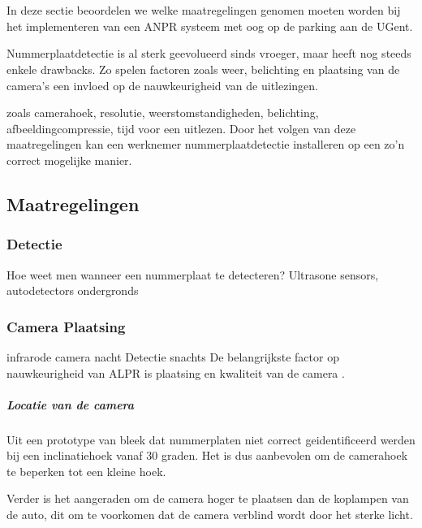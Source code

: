 
\chapter{}
\label{ch:maatregelingenraspberrypi}

In deze sectie beoordelen we welke maatregelingen genomen moeten worden bij het implementeren van een ANPR systeem met oog op de parking aan de UGent.

Nummerplaatdetectie is al sterk geevolueerd sinds vroeger, maar heeft nog steeds enkele drawbacks. Zo spelen factoren zoals weer, belichting en plaatsing van de camera's een invloed op de nauwkeurigheid van de uitlezingen.

zoals camerahoek, resolutie, weerstomstandigheden, belichting, afbeeldingcompressie, tijd voor een uitlezen. Door het volgen van deze maatregelingen kan een werknemer nummerplaatdetectie installeren op een zo'n correct mogelijke manier.

\section{Maatregelingen}

\subsection{Detectie}
Hoe weet men wanneer een nummerplaat te detecteren?
Ultrasone sensors, autodetectors ondergronds

\subsection{Camera Plaatsing}
infrarode camera nacht
Detectie snachts \autocite{boonsin2017car}
De belangrijkste factor op nauwkeurigheid van ALPR is plaatsing en kwaliteit van de camera \autocite{openalprcameraplacement}.

\paragraph{Locatie van de camera}
Uit een prototype van \textcite{arrieta2019prototype} bleek dat nummerplaten niet correct geidentificeerd werden bij een inclinatiehoek vanaf 30 graden. Het is dus aanbevolen om de camerahoek te beperken tot een kleine hoek.

Verder is het aangeraden om de camera hoger te plaatsen dan de koplampen van de auto, dit om te voorkomen dat de camera verblind wordt door het sterke licht.

